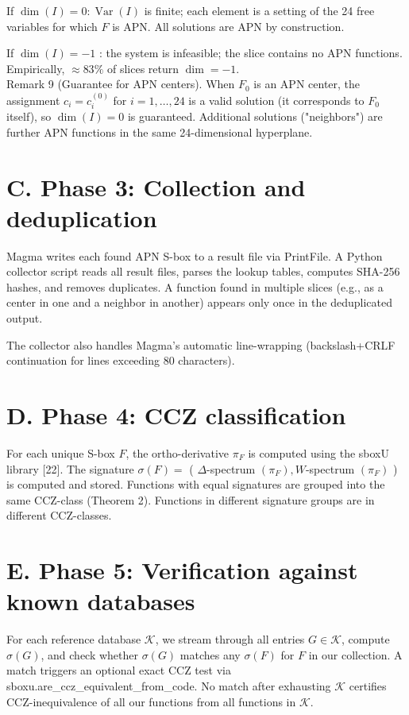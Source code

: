 \documentclass[10pt]{article}
\begin{document}
If $\operatorname{dim}(I)=0: \operatorname{Var}(I)$ is finite; each element is a setting of the 24 free variables for which $F$ is APN. All solutions are APN by construction.

If $\operatorname{dim}(I)=-1$ : the system is infeasible; the slice contains no APN functions. Empirically, $\approx 83 \%$ of slices return $\operatorname{dim}=-1$.\\
Remark 9 (Guarantee for APN centers). When $F_{0}$ is an APN center, the assignment $c_{i}=c_{i}^{(0)}$ for $i=1, \ldots, 24$ is a valid solution (it corresponds to $F_{0}$ itself), so $\operatorname{dim}(I)=0$ is guaranteed. Additional solutions ("neighbors") are further APN functions in the same 24-dimensional hyperplane.

\section*{C. Phase 3: Collection and deduplication}
Magma writes each found APN S-box to a result file via PrintFile. A Python collector script reads all result files, parses the lookup tables, computes SHA-256 hashes, and removes duplicates. A function found in multiple slices (e.g., as a center in one and a neighbor in another) appears only once in the deduplicated output.

The collector also handles Magma's automatic line-wrapping (backslash+CRLF continuation for lines exceeding 80 characters).

\section*{D. Phase 4: CCZ classification}
For each unique S-box $F$, the ortho-derivative $\pi_{F}$ is computed using the sboxU library [22]. The signature $\sigma(F)=$ ( $\Delta$-spectrum $\left(\pi_{F}\right), W$-spectrum $\left(\pi_{F}\right)$ ) is computed and stored. Functions with equal signatures are grouped into the same CCZ-class (Theorem 2). Functions in different signature groups are in different CCZ-classes.

\section*{E. Phase 5: Verification against known databases}
For each reference database $\mathcal{K}$, we stream through all entries $G \in \mathcal{K}$, compute $\sigma(G)$, and check whether $\sigma(G)$ matches any $\sigma(F)$ for $F$ in our collection. A match triggers an optional exact CCZ test via sboxu.are\_ccz\_equivalent\_from\_code. No match after exhausting $\mathcal{K}$ certifies CCZ-inequivalence of all our functions from all functions in $\mathcal{K}$.
\end{document}

